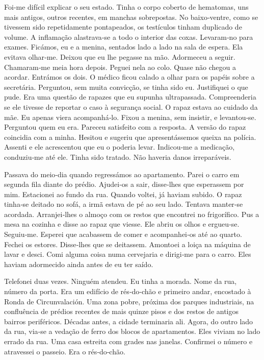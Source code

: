 Foi­‑me difícil explicar o seu estado. Tinha o corpo coberto de
hematomas, uns mais antigos, outros recentes, em manchas sobrepostas. No
baixo­‑ventre, como se tivessem sido repetidamente pontapeados, os
testículos tinham duplicado de volume. A inflamação alastrava­‑se a todo
o interior das coxas. Levaram­‑no para exames. Ficámos, eu e a menina,
sentados lado a lado na sala de espera. Ela evitava olhar­‑me. Deixou
que eu lhe pegasse na mão. Adormeceu a seguir. Chamaram­‑me meia hora
depois. Peguei nela ao colo. Quase não chegou a acordar. Entrámos os
dois. O médico ficou calado a olhar para os papéis sobre a secretária.
Perguntou, sem muita convicção, se tinha sido eu. Justifiquei o que
pude. Era uma questão de rapazes que eu supunha ultrapassada.
Compreenderia se ele tivesse de reportar o caso à segurança social. O
rapaz estava ao cuidado da mãe. Eu apenas viera acompanhá­‑lo. Fixou a
menina, sem insistir, e levantou­‑se. Perguntou quem eu era. Pareceu
satisfeito com a resposta. A versão do rapaz coincidia com a minha.
Hesitou e sugeriu que apresentássemos queixa na polícia. Assenti e ele
acrescentou que eu o poderia levar. Indicou­‑me a medicação,
conduziu­‑me até ele. Tinha sido tratado. Não haveria danos
irreparáveis.

Passava do meio­‑dia quando regressámos ao apartamento. Parei o carro em
segunda fila diante do prédio. Ajudei­‑os a sair, disse­‑lhes que
esperassem por mim. Estacionei ao fundo da rua. Quando voltei, já haviam
subido. O rapaz tinha­‑se deitado no sofá, a irmã estava de pé ao seu
lado. Tentava manter­‑se acordada. Arranjei­‑lhes o almoço com os restos
que encontrei no frigorífico. Pus a mesa na cozinha e disse ao rapaz que
viesse. Ele abriu os olhos e ergueu­‑se. Seguiu­‑me. Esperei que
acabassem de comer e acompanhei­‑os até ao quarto. Fechei os estores.
Disse­‑lhes que se deitassem. Amontoei a loiça na máquina de lavar e
desci. Comi alguma coisa numa cervejaria e dirigi­‑me para o carro. Eles
haviam adormecido ainda antes de eu ter saído.

Telefonei duas vezes. Ninguém atendeu. Eu tinha a morada. Nome da rua,
número da porta. Era um edifício de rés­‑do­‑chão e primeiro andar,
encostado à Ronda de Circunvalación. Uma zona pobre, próxima dos parques
industriais, na confluência de prédios recentes de mais quinze pisos e
dos restos de antigos bairros periféricos. Décadas antes, a cidade
terminaria ali. Agora, do outro lado da rua, via­‑se a vedação de ferro
dos blocos de apartamentos. Eles viviam no lado errado da rua. Uma casa
estreita com grades nas janelas. Confirmei o número e atravessei o
passeio. Era o rés­‑do­‑chão.

